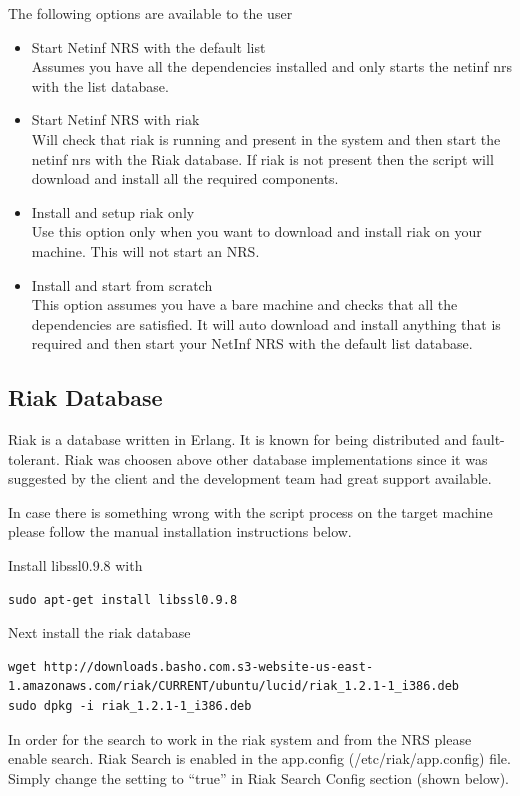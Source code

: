 The following options are available to the user

\begin{itemize}
\item Start Netinf NRS with the default list\\
Assumes you have all the dependencies installed and only starts the netinf nrs with the list database.
\item Start Netinf NRS with riak\\
Will check that riak is running and present in the system and then start the netinf nrs with the Riak database.
If riak is not present then the script will download and install all the required components. 
\item Install and setup riak only\\
Use this option only when you want to download and install riak on your machine. This will not start an NRS.
\item Install and start from scratch\\
This option assumes you have a bare machine and checks that all the dependencies are satisfied. It will auto download and install anything that is required and then start your NetInf NRS with the default list database. 
\end{itemize}


\subsection{Riak Database}

Riak is a database written in Erlang. It is known for being distributed and fault-tolerant. Riak was choosen above other database implementations since it was suggested by the client and the development team had great support available. 

In case there is something wrong with the script process on the target machine please follow the manual installation instructions below.

Install libssl0.9.8 with
\begin {verbatim}
sudo apt-get install libssl0.9.8
\end{verbatim}

Next install the riak database
\begin{verbatim}
wget http://downloads.basho.com.s3-website-us-east-1.amazonaws.com/riak/CURRENT/ubuntu/lucid/riak_1.2.1-1_i386.deb
sudo dpkg -i riak_1.2.1-1_i386.deb
\end{verbatim}

In order for the search to work in the riak system and from the NRS please enable search.
Riak Search is enabled in the app.config (/etc/riak/app.config) file. Simply change the setting to “true” in Riak Search Config section (shown below).

